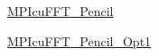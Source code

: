 
\begin{DoxyItemize}
\item \mbox{\hyperlink{classMPIcuFFT__Pencil}{MPIcu\+FFT\+\_\+\+Pencil}}
\item \mbox{\hyperlink{classMPIcuFFT__Pencil__Opt1}{MPIcu\+FFT\+\_\+\+Pencil\+\_\+\+Opt1}} 
\end{DoxyItemize}